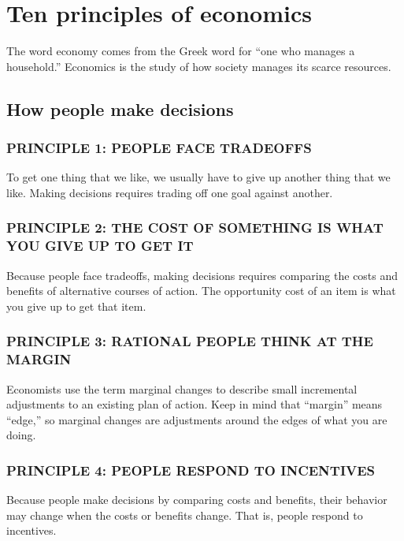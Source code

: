 
\chapter{Ten principles of economics}


The word economy comes from the Greek word for ``one who manages a household.''
Economics is the study of how society manages its scarce resources.

\section{How people make decisions}

\subsection*{PRINCIPLE 1: PEOPLE FACE TRADEOFFS}

To get one thing that we like, we usually have to give up another thing that we like.
Making decisions requires trading off one goal against another.


\subsection*{PRINCIPLE 2: THE COST OF SOMETHING IS WHAT YOU GIVE UP TO GET IT}

Because people face tradeoffs, making decisions requires comparing the costs and benefits of alternative courses of action.
The opportunity cost of an item is what you give up to get that item.

\subsection*{PRINCIPLE 3: RATIONAL PEOPLE THINK AT THE MARGIN}

Economists use the term marginal changes to describe small incremental adjustments to an existing plan of action.
Keep in mind that ``margin'' means ``edge,'' so marginal changes are adjustments around the edges of what you are doing.

\subsection*{PRINCIPLE 4: PEOPLE RESPOND TO INCENTIVES}

Because people make decisions by comparing costs and benefits, their behavior may change when the costs or benefits change.
That is, people respond to incentives. 

